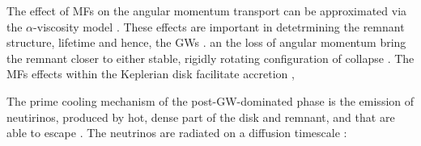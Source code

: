 The effect of \acp{MF} on the angular momentum transport can be approximated via 
the $\alpha$-viscosity model \cite{Shakura:1972te}. These effects are important 
in detetrmining the remnant structure, lifetime and hence, the \pmerg{} \acp{GW} 
\cite{Radice:2017zta,Shibata:2017xht}. 
an the loss of angular momentum bring the remnant closer to either stable, 
rigidly rotating configuration of collapse \cite{Hotokezaka:2013iia}. 
%
The \acp{MF} effects within the Keplerian disk facilitate accretion \cite{Fernandez:2015use,Fujibayashi:2017puw,Fernandez:2018kax,Miller:2019dpt},

The prime cooling mechanism of the post-\ac{GW}-dominated phase is the emission of 
neutirinos, produced by hot, dense part of the disk and remnant, and that are 
able to escape \cite{Eichler:1989ve,Rosswog:2003rv,Sekiguchi:2011zd}. 
The neutrinos are radiated on a diffusion timescale \cite{Perego:2014fma}:

